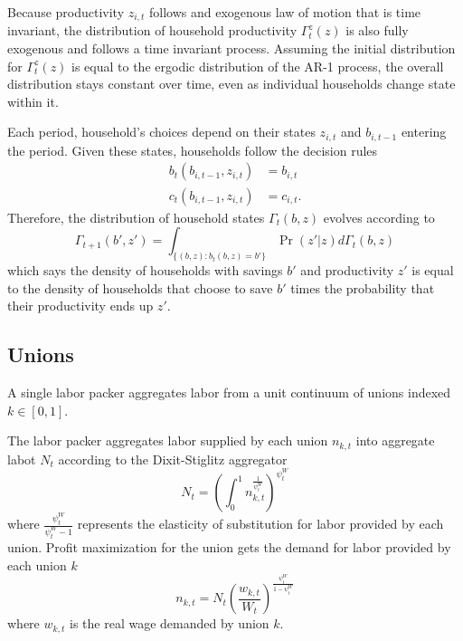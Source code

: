 Because productivity $z_{i, t}$ follows and exogenous law of motion that is time invariant, the distribution of household productivity $\Gamma_t^z (z)$ is also fully exogenous and follows a time invariant process. Assuming the initial distribution for $\Gamma_t^z (z)$ is equal to the ergodic distribution of the AR-1 process, the overall distribution stays constant over time, even as individual households change state within it.

Each period, household's choices depend on their states $z_{i, t}$ and $b_{i, t - 1}$ entering the period. Given these states, households follow the decision rules
\begin{align*}
    b_t (b_{i, t-1}, z_{i, t}) &= b_{i, t} \\
    c_t (b_{i, t-1}, z_{i, t}) &= c_{i, t}.
\end{align*}
Therefore, the distribution of household states $\Gamma_t (b, z)$ evolves according to
\begin{equation*}
    \Gamma_{t + 1} (b', z') = \int_{\{(b, z) : b_t(b, z) = b'\}} \Pr (z' | z) d \Gamma_t (b, z)
\end{equation*}
which says the density of households with savings $b'$ and productivity $z'$ is equal to the density of households that choose to save $b'$ times the probability that their productivity ends up $z'$.


\subsection{Unions} \label{subsec:unions}

A single labor packer aggregates labor from a unit continuum of unions indexed $k \in [0, 1]$.

The labor packer aggregates labor supplied by each union $n_{k,t}$ into aggregate labot $N_t$ according to the Dixit-Stiglitz aggregator
\begin{equation*}
    N_t = \left(\int_0^1 n_{k, t}^\frac{1}{\psi_t^W}\right)^{\psi_t^W}
\end{equation*}
where $\frac{\psi_t^W}{\psi_t^W - 1}$ represents the elasticity of substitution for labor provided by each union. Profit maximization for the union gets the demand for labor provided by each union $k$
\begin{equation*}
    n_{k, t} = N_t \left(\frac{w_{k, t}}{W_t}\right)^\frac{\psi_t^W}{1 - \psi_t^W}
\end{equation*}
where $w_{k, t}$ is the real wage demanded by union $k$.

